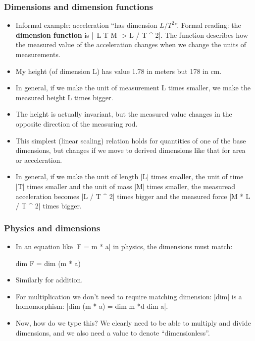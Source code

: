\documentclass{beamer}
\begin{document}
\begin{frame}
\frametitle{Dimensions and dimension functions}
\begin{itemize}
\item Informal example: acceleration ``has dimension \(L /
  T^2\)''. Formal reading: the \textbf{dimension function}
  is |\ L T M -> L / T ^ 2|. The function describes how the measured
  value of the acceleration changes when we change the units of
  measurements.
\item My height (of dimension L) has value 1.78 in meters but 178 in
  cm.
\item In general, if we make the unit of measurement L times smaller,
  we make the measured height L times bigger.
\item The height is actually invariant, but the measured value changes
  in the opposite direction of the measuring rod.
\item This simplest (linear scaling) relation holds for quantities of
  one of the base dimensions, but changes if we move to derived
  dimensions like that for area or acceleration.
\item In general, if we make the unit of length |L| times smaller, the
  unit of time |T| times smaller and the unit of mass |M| times
  smaller, the measuread acceleration becomes |L / T ^ 2| times bigger
  and the measured force |M * L / T ^ 2| times bigger.
\end{itemize}
\end{frame}
\begin{frame}
  \frametitle{Physics and dimensions}
\begin{itemize}
\item In an equation like |F = m * a| %
  in physics, the dimensions must match:
\begin{spec}
dim F = dim (m * a)
\end{spec}
\item Similarly for addition.
\item For multiplication we don't need to require matching dimension:
  |dim| is a homomorphism: |dim (m * a) = dim m *d dim a|.
\item Now, how do we type this? We clearly need to be able to multiply
  and divide dimensions, and we also need a value to denote
  ``dimensionless''.
\end{itemize}
\end{frame}
\end{document}
